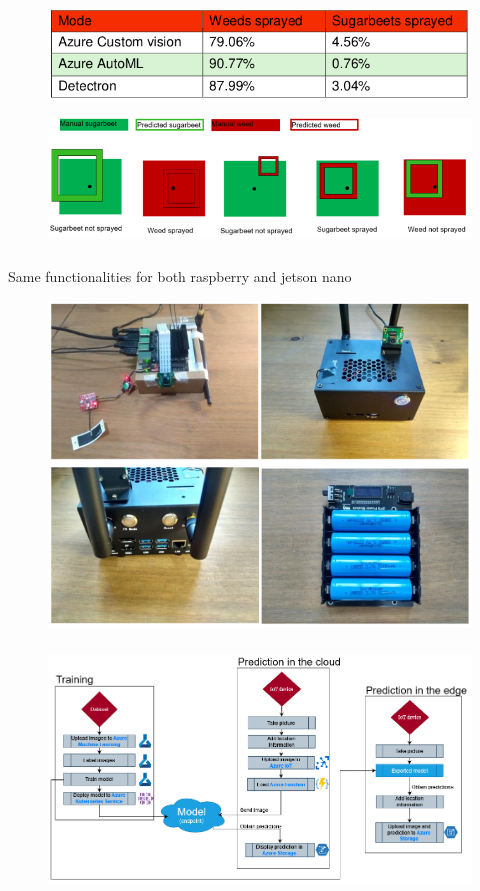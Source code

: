 \documentclass{beamer}
\makeatletter
\newcommand*{\currentname}{\@currentlabelname}
\makeatother
\begin{document}
\begin{frame}
\frametitle{\currentname}
\begin{figure}
\includegraphics[width=0.9\linewidth]{Imagens/results_table.png}
\end{figure}

\begin{figure}
\includegraphics[width=0.9\linewidth]{Imagens/metric_explanation.png}
\end{figure}

\end{frame}

\begin{frame}
\frametitle{\currentname}
Same functionalities for both raspberry and jetson nano
\begin{figure}
\includegraphics[width=0.7\linewidth]{Imagens/jetson.png}
\end{figure}
\end{frame}

\begin{frame}
\frametitle{\currentname}
\begin{figure}
\includegraphics[width=1\linewidth]{Imagens/workflow.png}
\end{figure}
\end{frame}
\end{document}

